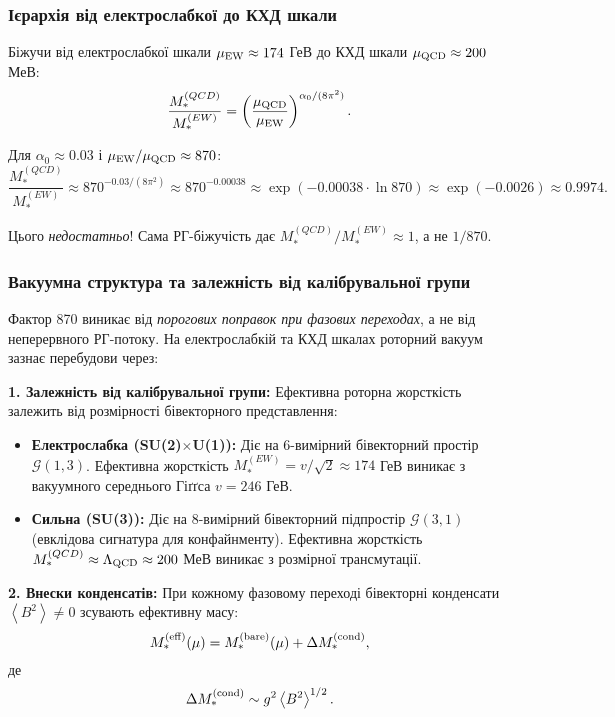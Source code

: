 \documentclass[11pt,a4paper]{article}
\numberwithin{equation}{section}
\theoremstyle{plain}
\theoremstyle{definition}
\theoremstyle{remark}
\newcommand{\avg}[1]{\left\langle #1 \right\rangle}
\newcommand{\Cl}{\mathcal{G}}               %
\begin{document}
\subsubsection{Ієрархія від електрослабкої до КХД шкали}

Біжучи від електрослабкої шкали $\mu_{\rm EW}\approx 174$ ГеВ до КХД шкали $\mu_{\rm QCD}\approx 200$ МеВ:
\begin{equation}
\frac{M_*^{(QCD)}}{M_*^{(EW)}} = \left(\frac{\mu_{\rm QCD}}{\mu_{\rm EW}}\right)^{\alpha_0/(8\pi^2)}.
\label{eq:EW-QCD-ratio}
\end{equation}

Для $\alpha_0\approx 0{.}03$ і $\mu_{\rm EW}/\mu_{\rm QCD}\approx 870$:
\begin{equation}
\frac{M_*^{(QCD)}}{M_*^{(EW)}} \approx 870^{-0{.}03/(8\pi^2)} \approx 870^{-0{.}00038} \approx \exp(-0{.}00038\cdot \ln 870) \approx \exp(-0{.}0026) \approx 0{.}9974.
\label{eq:ratio-RG-alone}
\end{equation}

Цього \emph{недостатньо}! Сама РГ-біжучість дає $M_*^{(QCD)}/M_*^{(EW)} \approx 1$, а не $1/870$.

\subsubsection{Вакуумна структура та залежність від калібрувальної групи}

Фактор 870 виникає від \emph{порогових поправок при фазових переходах}, а не від неперервного РГ-потоку. На електрослабкій та КХД шкалах роторний вакуум зазнає перебудови через:

\textbf{1. Залежність від калібрувальної групи:} Ефективна роторна жорсткість залежить від розмірності бівекторного представлення:
\begin{itemize}
  \item \textbf{Електрослабка (SU(2)$\times$U(1)):} Діє на 6-вимірний бівекторний простір $\Cl(1,3)$. Ефективна жорсткість $M_*^{(EW)} = v/\sqrt{2} \approx 174$ ГеВ виникає з вакуумного середнього Гіґґса $v=246$ ГеВ.
  \item \textbf{Сильна (SU(3)):} Діє на 8-вимірний бівекторний підпростір $\Cl(3,1)$ (евклідова сигнатура для конфайнменту). Ефективна жорсткість $M_*^{(QCD)} \approx \Lambda_{\rm QCD} \approx 200$ МеВ виникає з розмірної трансмутації.
\end{itemize}

\textbf{2. Внески конденсатів:} При кожному фазовому переході бівекторні конденсати $\avg{B^2}\neq 0$ зсувають ефективну масу:
\begin{equation}
M_*^{(\rm eff)}(\mu) = M_*^{(\rm bare)}(\mu) + \Delta M_*^{(\rm cond)},
\label{eq:M-condensate}
\end{equation}
де
\begin{equation}
\Delta M_*^{(\rm cond)} \sim g^2 \avg{B^2}^{1/2}.
\label{eq:Delta-M-cond}
\end{equation}
\end{document}
